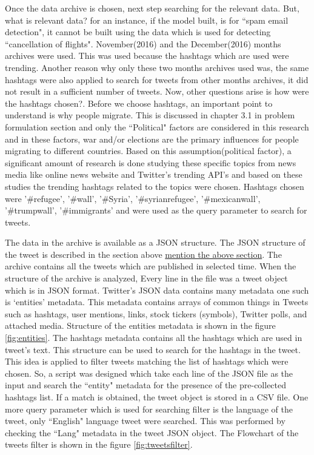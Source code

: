 Once the data archive is chosen, next step searching for the relevant data. But, what is relevant data? for an instance, if the model built, is for ``spam email detection", it cannot be built using the data which is used for detecting ``cancellation of flights". November(2016) and the December(2016) months archives were used. This was used because the hashtags which are used were trending. Another reason why only these two months archives used was, the same hashtags were also applied to search for tweets from other months archives, it did not result in a sufficient number of tweets. Now, other questions arise is how were the hashtags chosen?. Before we choose hashtags, an important point to understand is why people migrate. This is discussed in chapter 3.1 in problem formulation section and only the ``Political" factors are considered in this research and in these factors, war and/or elections are the primary influences for people migrating to different countries. Based on this assumption(political factor), a significant amount of research is done studying these specific topics from news media like online news website and Twitter's trending API's and based on these studies the trending hashtags related to the topics were chosen. Hashtags chosen were ’\#refugee’, ’\#wall’, ’\#Syria’, ’\#syrianrefugee’, ’\#mexicanwall’, ’\#trumpwall’, ’\#immigrants’ and were used as the query parameter to search for tweets. 

The data in the archive is available as a JSON structure. The JSON structure of the tweet is described in the section above \underline{mention the above section}. The archive contains all the tweets which are published in selected time. When the structure of the archive is analyzed, Every line in the file was a tweet object which is in JSON format. Twitter's JSON data contains many metadata one such is `entities' metadata. This metadata contains arrays of common things in Tweets such as hashtags, user mentions, links, stock tickers (symbols), Twitter polls, and attached media. Structure of the entities metadata is shown in the figure \ref{fig:entities}. The hashtags metadata contains all the hashtags which are used in tweet's text. This structure can be used to search for the hashtags in the tweet. This idea is applied to filter tweets matching the list of hashtags which were chosen. So, a script was designed which take each line of the JSON file as the input and search the ``entity" metadata for the presence of the pre-collected hashtags list. If a match is obtained, the tweet object is stored in a CSV file. One more query parameter which is used for searching filter is the language of the tweet, only ``English" language tweet were searched. This was performed by checking the ``Lang" metadata in the tweet JSON object. The Flowchart of the tweets filter is shown in the figure \ref{fig:tweetsfilter}.


